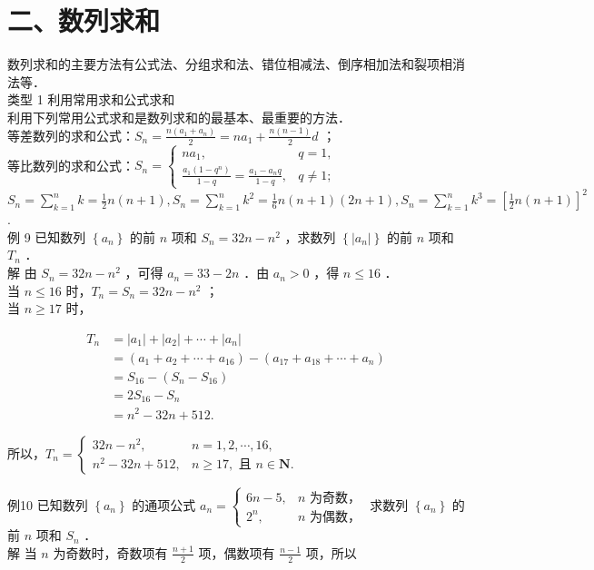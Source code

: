 \documentclass[10pt]{article}
\begin{document}
\section*{二、数列求和}
数列求和的主要方法有公式法、分组求和法、错位相减法、倒序相加法和裂项相消法等．\\
类型 1 利用常用求和公式求和\\
利用下列常用公式求和是数列求和的最基本、最重要的方法．\\
等差数列的求和公式：\(S_{n}=\frac{n\left(a_{1}+a_{n}\right)}{2}=n a_{1}+\frac{n(n-1)}{2} d\) ；\\
等比数列的求和公式：\(S_{n}= \begin{cases}n a_{1}, & q=1, \\ \frac{a_{1}\left(1-q^{n}\right)}{1-q}=\frac{a_{1}-a_{n} q}{1-q}, & q \neq 1 ; ~\end{cases}\)\\
\(S_{n}=\sum_{k=1}^{n} k=\frac{1}{2} n(n+1), S_{n}=\sum_{k=1}^{n} k^{2}=\frac{1}{6} n(n+1)(2 n+1), S_{n}=\sum_{k=1}^{n} k^{3}=\left[\frac{1}{2} n(n+1)\right]^{2}\).\\
例 9 已知数列 \(\left\{a_{n}\right\}\) 的前 \(n\) 项和 \(S_{n}=32 n-n^{2}\) ，求数列 \(\left\{\left|a_{n}\right|\right\}\) 的前 \(n\) 项和 \(T_{n}\) ．\\
解 由 \(S_{n}=32 n-n^{2}\) ，可得 \(a_{n}=33-2 n\) ．由 \(a_{n}>0\) ，得 \(n \leqslant 16\) ．\\
当 \(n \leqslant 16\) 时，\(T_{n}=S_{n}=32 n-n^{2}\) ；\\
当 \(n \geqslant 17\) 时，

\[
\begin{aligned}
T_{n} & =\left|a_{1}\right|+\left|a_{2}\right|+\cdots+\left|a_{n}\right| \\
& =\left(a_{1}+a_{2}+\cdots+a_{16}\right)-\left(a_{17}+a_{18}+\cdots+a_{n}\right) \\
& =S_{16}-\left(S_{n}-S_{16}\right) \\
& =2 S_{16}-S_{n} \\
& =n^{2}-32 n+512 .
\end{aligned}
\]

所以，\(T_{n}= \begin{cases}32 n-n^{2}, & n=1,2, \cdots, 16, \\ n^{2}-32 n+512, & n \geqslant 17, \text { 且 } n \in \mathbf{N} .\end{cases}\)

例10 已知数列 \(\left\{a_{n}\right\}\) 的通项公式 \(a_{n}=\left\{\begin{array}{ll}6 n-5, & n \text { 为奇数，} \\ 2^{n}, & n \text { 为偶数，}\end{array}\right.\) 求数列 \(\left\{a_{n}\right\}\) 的前 \(n\) 项和 \(S_{n}\) ．\\
解 当 \(n\) 为奇数时，奇数项有 \(\frac{n+1}{2}\) 项，偶数项有 \(\frac{n-1}{2}\) 项，所以
\end{document}
